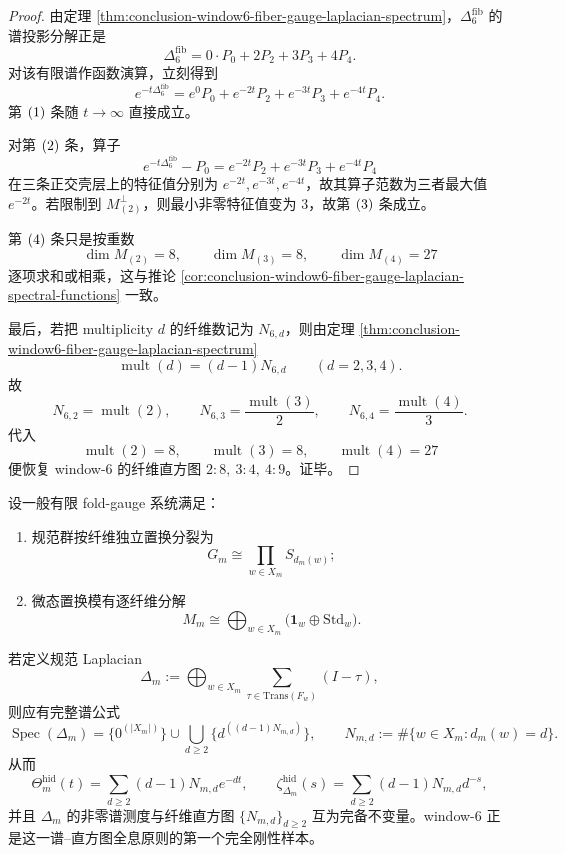 \begin{proof}
由定理 \ref{thm:conclusion-window6-fiber-gauge-laplacian-spectrum}，\(\Delta_6^{\mathrm{fib}}\) 的谱投影分解正是
\[
\Delta_6^{\mathrm{fib}}=0\cdot P_0+2P_2+3P_3+4P_4.
\]
对该有限谱作函数演算，立刻得到
\[
e^{-t\Delta_6^{\mathrm{fib}}}
=
e^0P_0+e^{-2t}P_2+e^{-3t}P_3+e^{-4t}P_4.
\]
第 \(\textup{(1)}\) 条随 \(t\to\infty\) 直接成立。

对第 \(\textup{(2)}\) 条，算子
\[
e^{-t\Delta_6^{\mathrm{fib}}}-P_0=e^{-2t}P_2+e^{-3t}P_3+e^{-4t}P_4
\]
在三条正交壳层上的特征值分别为 \(e^{-2t},e^{-3t},e^{-4t}\)，故其算子范数为三者最大值 \(e^{-2t}\)。若限制到 \(M_{(2)}^\perp\)，则最小非零特征值变为 \(3\)，故第 \(\textup{(3)}\) 条成立。

第 \(\textup{(4)}\) 条只是按重数
\[
\dim M_{(2)}=8,\qquad \dim M_{(3)}=8,\qquad \dim M_{(4)}=27
\]
逐项求和或相乘，这与推论 \ref{cor:conclusion-window6-fiber-gauge-laplacian-spectral-functions} 一致。

最后，若把 multiplicity \(d\) 的纤维数记为 \(N_{6,d}\)，则由定理 \ref{thm:conclusion-window6-fiber-gauge-laplacian-spectrum}
\[
\operatorname{mult}(d)=(d-1)N_{6,d}\qquad (d=2,3,4).
\]
故
\[
N_{6,2}=\operatorname{mult}(2),\qquad
N_{6,3}=\frac{\operatorname{mult}(3)}{2},\qquad
N_{6,4}=\frac{\operatorname{mult}(4)}{3}.
\]
代入
\[
\operatorname{mult}(2)=8,\qquad \operatorname{mult}(3)=8,\qquad \operatorname{mult}(4)=27
\]
便恢复 window-\(6\) 的纤维直方图 \(2{:}8,\ 3{:}4,\ 4{:}9\)。证毕。
\end{proof}

\begin{conjecture}\label{conj:conclusion-finite-foldgauge-laplacian-spectrum-histogram-holography}
设一般有限 fold-gauge 系统满足：
\begin{enumerate}
  \item 规范群按纤维独立置换分裂为
  \[
  G_m\cong \prod_{w\in X_m}S_{d_m(w)};
  \]
  \item 微态置换模有逐纤维分解
  \[
  M_m\cong \bigoplus_{w\in X_m}\bigl(\mathbf 1_w\oplus \mathrm{Std}_w\bigr).
  \]
\end{enumerate}
若定义规范 Laplacian
\[
\Delta_m:=\bigoplus_{w\in X_m}\sum_{\tau\in \mathrm{Trans}(F_w)}(I-\tau),
\]
则应有完整谱公式
\[
\operatorname{Spec}(\Delta_m)
=
\{0^{(|X_m|)}\}\cup \bigcup_{d\ge 2}\{d^{((d-1)N_{m,d})}\},
\qquad
N_{m,d}:=\#\{w\in X_m:d_m(w)=d\}.
\]
从而
\[
\Theta_m^{\mathrm{hid}}(t)=\sum_{d\ge 2}(d-1)N_{m,d}e^{-dt},
\qquad
\zeta_{\Delta_m}^{\mathrm{hid}}(s)=\sum_{d\ge 2}(d-1)N_{m,d}d^{-s},
\]
并且 \(\Delta_m\) 的非零谱测度与纤维直方图 \(\{N_{m,d}\}_{d\ge2}\) 互为完备不变量。window-\(6\) 正是这一谱--直方图全息原则的第一个完全刚性样本。
\end{conjecture}

